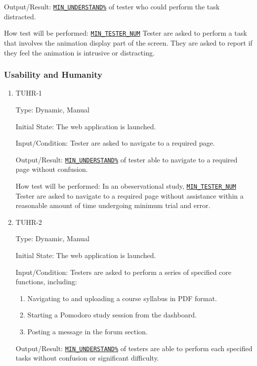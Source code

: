 \documentclass[12pt, titlepage]{article}
\begin{document}
\begin{enumerate}
\begin{enumerate}
Output/Result: \hyperref[MIN_UNDERSTAND]{\texttt{MIN\_UNDERSTAND\%}} of tester who could perform the task distracted.
					
How test will be performed: \hyperref[MIN_TESTER_NUM]{\texttt{MIN\_TESTER\_NUM}} Tester are asked to perform a task that involves the animation display part of the screen.  They are asked to report if they feel the animation is intrusive or distracting.
\end{enumerate}

\subsubsection{Usability and Humanity}

\begin{enumerate}
\item{TUHR-1\\}\label{TUHR-1}

Type: Dynamic, Manual
					
Initial State: The web application is launched.
					
Input/Condition: Tester are asked to navigate to a required page.
					
Output/Result: \hyperref[MIN_UNDERSTAND]{\texttt{MIN\_UNDERSTAND\%}} of tester able to navigate to a required page without confusion.
					
How test will be performed: In an obeservational study, \hyperref[MIN_TESTER_NUM]{\texttt{MIN\_TESTER\_NUM}} Tester are asked to navigate to a required page without assistance within a reasonable amount of time undergoing minimum trial and error.

\item{TUHR-2\\}\label{TUHR-2}

Type: Dynamic, Manual
					
Initial State: The web application is launched.
					
Input/Condition: Testers are asked to perform a series of specified core functions, including:
\begin{enumerate}
    \item Navigating to and uploading a course syllabus in PDF format.
    \item Starting a Pomodoro study session from the dashboard.
    \item Posting a message in the forum section.
\end{enumerate}

Output/Result: \hyperref[MIN_UNDERSTAND]{\texttt{MIN\_UNDERSTAND\%}} of testers are able to perform each specified tasks without confusion or significant difficulty.
					

\end{enumerate}
\end{enumerate}
\end{document}

